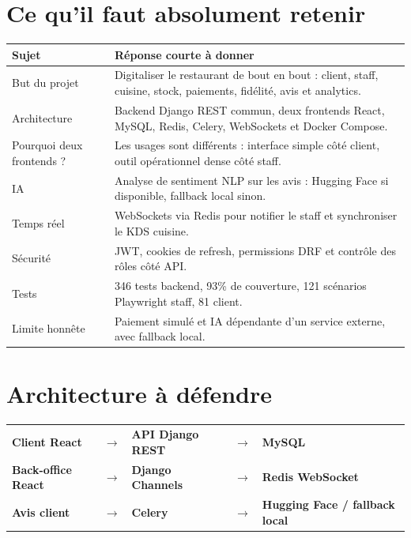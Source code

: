 \documentclass[10pt,a4paper]{article}
\begin{document}
\section{Ce qu'il faut absolument retenir}

\begin{tabularx}{\textwidth}{p{4.2cm}Y}
\toprule
\textbf{Sujet} & \textbf{Réponse courte à donner} \\
\midrule
But du projet & Digitaliser le restaurant de bout en bout : client, staff, cuisine, stock, paiements, fidélité, avis et analytics. \\
Architecture & Backend Django REST commun, deux frontends React, MySQL, Redis, Celery, WebSockets et Docker Compose. \\
Pourquoi deux frontends ? & Les usages sont différents : interface simple côté client, outil opérationnel dense côté staff. \\
IA & Analyse de sentiment NLP sur les avis : Hugging Face si disponible, fallback local sinon. \\
Temps réel & WebSockets via Redis pour notifier le staff et synchroniser le KDS cuisine. \\
Sécurité & JWT, cookies de refresh, permissions DRF et contrôle des rôles côté API. \\
Tests & 346 tests backend, 93\% de couverture, 121 scénarios Playwright staff, 81 client. \\
Limite honnête & Paiement simulé et IA dépendante d'un service externe, avec fallback local. \\
\bottomrule
\end{tabularx}

\section{Architecture à défendre}

\begin{tcolorbox}[title=\textbf{Vue simple de l'architecture}]
\begin{center}
\begin{tabularx}{0.96\textwidth}{Y c Y c Y}
\textbf{Client React} & $\rightarrow$ & \textbf{API Django REST} & $\rightarrow$ & \textbf{MySQL}\\
\textbf{Back-office React} & $\rightarrow$ & \textbf{Django Channels} & $\rightarrow$ & \textbf{Redis WebSocket}\\
\textbf{Avis client} & $\rightarrow$ & \textbf{Celery} & $\rightarrow$ & \textbf{Hugging Face / fallback local}\\
\end{tabularx}
\end{center}
\end{tcolorbox}
\end{document}
